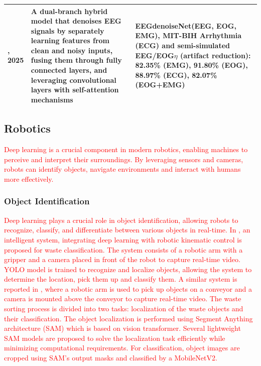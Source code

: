 \documentclass[preprint,12pt]{elsarticle}
\begin{document}
\begin{center}
\begin{table}
\begin{tabular}{|p{1cm} | p{6.5cm} | p{6.5cm}|}
 \hline
 \citep{cai_dhct-gan_2025}, 2025 & A dual-branch hybrid model that denoises EEG signals by separately learning features from clean and noisy inputs, fusing them through fully connected layers, and leveraging convolutional layers with self-attention mechanisms & EEGdenoiseNet(EEG, EOG, EMG), MIT-BIH Arrhythmia (ECG) and semi-simulated EEG/EOG\newline $\eta$ (artifact reduction): 82.35\% (EMG), 91.80\% (EOG), 88.97\% (ECG), 82.07\% (EOG+EMG)  \\ 
 \hline
\end{tabular}
\label{table_summary_eeg_studies}
\end{table}
\end{center}

\subsection{Robotics}
\textcolor{red}{Deep learning is a crucial component in modern robotics, enabling machines to perceive and interpret their surroundings. By leveraging sensors and cameras, robots can identify objects, navigate environments and interact with humans more effectively.}

\subsubsection{Object Identification}
\textcolor{red}{Deep learning plays a crucial role in object identification, allowing robots to recognize, classify, and differentiate between various objects in real-time. In \citep{le_application_2025}, an intelligent system, integrating deep learning with robotic kinematic control is proposed for waste classification. The system consists of a robotic arm with a gripper and a camera placed in front of the robot to capture real-time video. YOLO model is trained to recognize and localize objects, allowing the system to determine the location, pick them up and classify them. A similar system is reported in \citep{vukicevic_versatile_2025}, where a robotic arm is used to pick up objects on a conveyor and a camera is mounted above the conveyor to capture real-time video. The waste sorting process is divided into two tasks: localization of the waste objects and their classification. The object localization is performed using Segment Anything architecture (SAM) \citep{kirillov_segment_2023} which is based on vision transformer. Several lightweight SAM models are proposed to solve the localization task efficiently while minimizing computational requirements. For classification, object images are cropped using SAM's output masks and classified by a MobileNetV2.}
\end{document}
